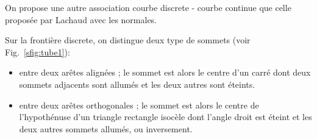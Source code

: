 \documentclass{report}
\begin{document}
On propose une autre association courbe discrete - courbe continue que celle proposée par Lachaud avec les normales.

Sur la frontière discrete, on distingue deux type de sommets (voir Fig.~\ref{sfig:tube1}):
\begin{itemize}
\item
  entre deux arêtes alignées ; le sommet est alors le centre d'un carré dont deux sommets adjacents sont allumés et les deux autres sont éteints.
\item
  entre deux arêtes orthogonales ; le sommet est alors le centre de l'hypothénuse d'un triangle rectangle isocèle dont l'angle droit est éteint et les deux autres sommets allumés, ou inversement.
\end{itemize}
  
\begin{figure}[!h]
  \centering
  \hspace{1cm}

\end{figure}
\end{document}
